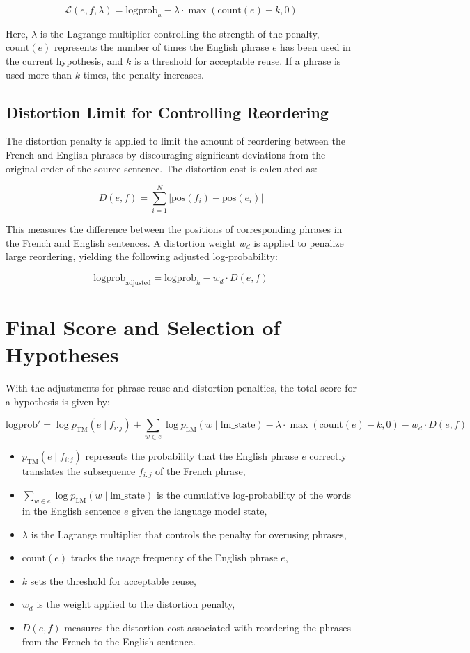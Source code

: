 \documentclass{article}
\begin{document}
\[
\mathcal{L}(e, f, \lambda) = \text{logprob}_h - \lambda \cdot \max(\text{count}(e) - k, 0)
\]

Here, \( \lambda \) is the Lagrange multiplier controlling the strength of the penalty, \( \text{count}(e) \) represents the number of times the English phrase \( e \) has been used in the current hypothesis, and \( k \) is a threshold for acceptable reuse. If a phrase is used more than \( k \) times, the penalty increases.

\subsection{Distortion Limit for Controlling Reordering}
The distortion penalty is applied to limit the amount of reordering between the French and English phrases by discouraging significant deviations from the original order of the source sentence. The distortion cost is calculated as:

\[
D(e, f) = \sum_{i=1}^N \left| \text{pos}(f_i) - \text{pos}(e_i) \right|
\]

This measures the difference between the positions of corresponding phrases in the French and English sentences. A distortion weight \( w_d \) is applied to penalize large reordering, yielding the following adjusted log-probability:

\[
\text{logprob}_{\text{adjusted}} = \text{logprob}_h - w_d \cdot D(e, f)
\]

\section{Final Score and Selection of Hypotheses}
With the adjustments for phrase reuse and distortion penalties, the total score for a hypothesis is given by:

\[
\text{logprob}' = \log p_{\text{TM}}(e \mid f_{i:j}) + \sum_{w \in e} \log p_{\text{LM}}(w \mid \text{lm\_state}) - \lambda \cdot \max(\text{count}(e) - k, 0) - w_d \cdot D(e, f)
\]

\begin{itemize}
    \item \( p_{\text{TM}}(e \mid f_{i:j}) \) represents the probability that the English phrase \( e \) correctly translates the subsequence \( f_{i:j} \) of the French phrase,
    \item \( \sum_{w \in e} \log p_{\text{LM}}(w \mid \text{lm\_state}) \) is the cumulative log-probability of the words in the English sentence \( e \) given the language model state,
    \item \( \lambda \) is the Lagrange multiplier that controls the penalty for overusing phrases,
    \item \( \text{count}(e) \) tracks the usage frequency of the English phrase \( e \),
    \item \( k \) sets the threshold for acceptable reuse,
    \item \( w_d \) is the weight applied to the distortion penalty,
    \item \( D(e, f) \) measures the distortion cost associated with reordering the phrases from the French to the English sentence.
\end{itemize}
\end{document}
